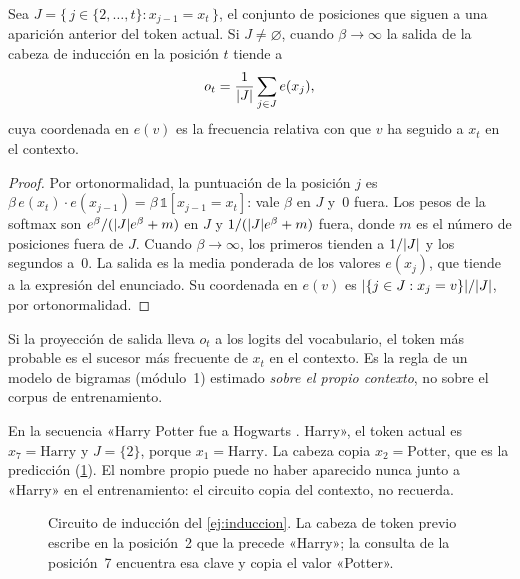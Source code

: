 \begin{proposicion}\label{prop:induccion}
Sea $J=\{\,j\in\{2,\dots,t\}:x_{j-1}=x_t\,\}$, el conjunto de posiciones que siguen a una aparición anterior del token actual. Si $J\ne\varnothing$, cuando $\beta\to\infty$ la salida de la cabeza de inducción en la posición $t$ tiende a
\[
o_t=\frac{1}{\lvert J\rvert}\sum_{j\in J}e(x_j),
\]
cuya coordenada en $e(v)$ es la frecuencia relativa con que $v$ ha seguido a $x_t$ en el contexto.
\end{proposicion}

\begin{proof}
Por ortonormalidad, la puntuación de la posición $j$ es $\beta\,e(x_t)\cdot e(x_{j-1})=\beta\,\mathbb{1}[x_{j-1}=x_t]$: vale $\beta$ en $J$ y~$0$ fuera. Los pesos de la softmax son $e^{\beta}/(\lvert J\rvert e^{\beta}+m)$ en $J$ y $1/(\lvert J\rvert e^{\beta}+m)$ fuera, donde $m$ es el número de posiciones fuera de $J$. Cuando $\beta\to\infty$, los primeros tienden a $1/\lvert J\rvert$ y los segundos a~$0$. La salida es la media ponderada de los valores $e(x_j)$, que tiende a la expresión del enunciado. Su coordenada en $e(v)$ es $\lvert\{j\in J:x_j=v\}\rvert/\lvert J\rvert$, por ortonormalidad.
\end{proof}

Si la proyección de salida lleva $o_t$ a los logits del vocabulario, el token más probable es el sucesor más frecuente de $x_t$ en el contexto. Es la regla de un modelo de bigramas (módulo~1) estimado \emph{sobre el propio contexto}, no sobre el corpus de entrenamiento.

\begin{ejemplo}\label{ej:induccion}
En la secuencia «Harry Potter fue a Hogwarts . Harry», el token actual es $x_7=\text{Harry}$ y $J=\{2\}$, porque $x_1=\text{Harry}$. La cabeza copia $x_2=\text{Potter}$, que es la predicción (\cref{fig:induccion}). El nombre propio puede no haber aparecido nunca junto a «Harry» en el entrenamiento: el circuito copia del contexto, no recuerda.
\end{ejemplo}

\begin{figure}[h]
\centering
{}
\caption{Circuito de inducción del \cref{ej:induccion}. La cabeza de token previo escribe en la posición~2 que la precede «Harry»; la consulta de la posición~7 encuentra esa clave y copia el valor «Potter».}
\label{fig:induccion}
\end{figure}

